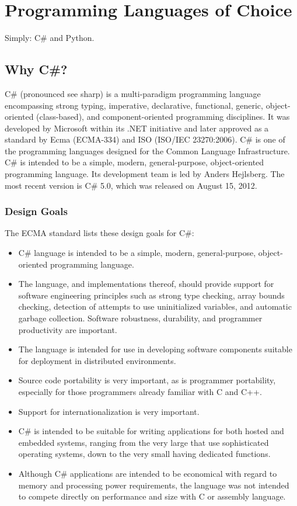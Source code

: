 \documentclass[12pt,a4paper,final,twoside,titlepage]{book}
\begin{document}
\section{Programming Languages of Choice}
Simply: C\# and Python.
\subsection{Why C\#?}
C\# (pronounced see sharp) is a multi-paradigm programming language encompassing strong typing, imperative, declarative, functional, generic, object-oriented (class-based), and component-oriented programming disciplines. It was developed by Microsoft within its .NET initiative and later approved as a standard by Ecma (ECMA-334) and ISO (ISO/IEC 23270:2006). C\# is one of the programming languages designed for the Common Language Infrastructure.
C\# is intended to be a simple, modern, general-purpose, object-oriented programming language. Its development team is led by Anders Hejlsberg. The most recent version is C\# 5.0, which was released on August 15, 2012.
\subsubsection{Design Goals}
The ECMA standard lists these design goals for C\#:
\begin{itemize}
\item C\# language is intended to be a simple, modern, general-purpose, object-oriented programming language.
\item The language, and implementations thereof, should provide support for software engineering principles such as strong type checking, array bounds checking, detection of attempts to use uninitialized variables, and automatic garbage collection. Software robustness, durability, and programmer productivity are important.
\item The language is intended for use in developing software components suitable for deployment in distributed environments.
\item Source code portability is very important, as is programmer portability, especially for those programmers already familiar with C and C++.
\item Support for internationalization is very important.
\item C\# is intended to be suitable for writing applications for both hosted and embedded systems, ranging from the very large that use sophisticated operating systems, down to the very small having dedicated functions.
\item Although C\# applications are intended to be economical with regard to memory and processing power requirements, the language was not intended to compete directly on performance and size with C or assembly language.
\end{itemize}
\end{document}

